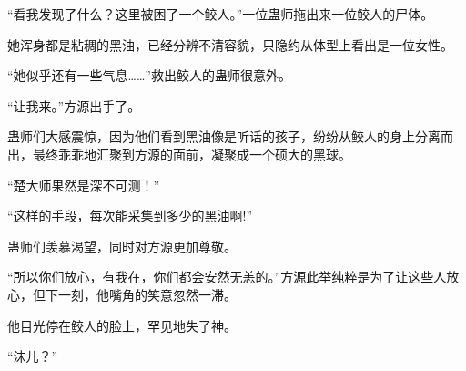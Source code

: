 \begin{this_body}
“看我发现了什么？这里被困了一个鲛人。”一位蛊师拖出来一位鲛人的尸体。

她浑身都是粘稠的黑油，已经分辨不清容貌，只隐约从体型上看出是一位女性。

“她似乎还有一些气息……”救出鲛人的蛊师很意外。

“让我来。”方源出手了。

蛊师们大感震惊，因为他们看到黑油像是听话的孩子，纷纷从鲛人的身上分离而出，最终乖乖地汇聚到方源的面前，凝聚成一个硕大的黑球。

“楚大师果然是深不可测！”

“这样的手段，每次能采集到多少的黑油啊!”

蛊师们羡慕渴望，同时对方源更加尊敬。

“所以你们放心，有我在，你们都会安然无恙的。”方源此举纯粹是为了让这些人放心，但下一刻，他嘴角的笑意忽然一滞。

他目光停在鲛人的脸上，罕见地失了神。

“沫儿？”

\end{this_body}

